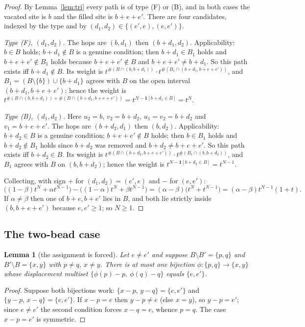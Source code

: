 \documentclass[11pt]{article}
\newtheorem{lemma}[theorem]{Lemma}
\theoremstyle{definition}
\newcommand{\one}{\mathbf{1}}
\begin{document}
\begin{proof}
By Lemma~\ref{lem:tri} every path is of type (F) or (B), and in both cases the vacated site is
$b$ and the filled site is $b+e+e'$. There are four candidates, indexed by the type and by
$(d_1,d_2)\in\{(e',e),(e,e')\}$.

\emph{Type (F), $(d_1,d_2)$.} The hops are $(b,d_1)$ then $(b+d_1,d_2)$. Applicability: $b\in B$
holds; $b+d_1\notin B$ is a genuine condition; then $b+d_1\in B_1$ holds and
$b+e+e'\notin B_1$ holds because $b+e+e'\notin B$ and $b+e+e'\ne b+d_1$. So this path exists iff
$b+d_1\notin B$. Its weight is $t^{\#(B\cap(b,b+d_1))}\cdot t^{\#(B_1\cap(b+d_1,b+e+e'))}$, and
$B_1=(B\setminus\{b\})\cup\{b+d_1\}$ agrees with $B$ on the open interval $(b+d_1,b+e+e')$;
hence the weight is
$t^{\#(B\cap(b,b+d_1))+\#(B\cap(b+d_1,b+e+e'))}=t^{N-\one[b+d_1\in B]}=t^{N}$.

\emph{Type (B), $(d_1,d_2)$.} Here $u_2=b$, $v_2=b+d_2$, $u_1=v_2=b+d_2$ and $v_1=b+e+e'$. The
hops are $(b+d_2,d_1)$ then $(b,d_2)$. Applicability: $b+d_2\in B$ is a genuine condition;
$b+e+e'\notin B$ holds; then $b\in B_1$ holds and $b+d_2\notin B_1$ holds since $b+d_2$ was
removed and $b+d_2\ne b+e+e'$. So this path exists iff $b+d_2\in B$. Its weight is
$t^{\#(B\cap(b+d_2,b+e+e'))}\cdot t^{\#(B_1\cap(b,b+d_2))}$, and $B_1$ agrees with $B$ on
$(b,b+d_2)$; hence the weight is $t^{N-\one[b+d_2\in B]}=t^{N-1}$.

Collecting, with sign $+$ for $(d_1,d_2)=(e',e)$ and $-$ for $(e,e')$:
\[
\bigl((1-\beta)t^{N}+\alpha t^{N-1}\bigr)-\bigl((1-\alpha)t^{N}+\beta t^{N-1}\bigr)
=(\alpha-\beta)\bigl(t^{N}+t^{N-1}\bigr)=(\alpha-\beta)t^{N-1}(1+t).
\]
If $\alpha\ne\beta$ then one of $b+e,b+e'$ lies in $B$, and both lie strictly inside
$(b,b+e+e')$ because $e,e'\ge1$; so $N\ge1$.
\end{proof}

\subsection*{The two-bead case}

\begin{lemma}[the assignment is forced]\label{lem:assign}
Let $e\ne e'$ and suppose $B\setminus B'=\{p,q\}$ and $B'\setminus B=\{x,y\}$ with $p\ne q$,
$x\ne y$. There is at most one bijection $\phi:\{p,q\}\to\{x,y\}$ whose displacement multiset
$\{\phi(p)-p,\ \phi(q)-q\}$ equals $\{e,e'\}$.
\end{lemma}

\begin{proof}
Suppose both bijections work: $\{x-p,\,y-q\}=\{e,e'\}$ and $\{y-p,\,x-q\}=\{e,e'\}$. If
$x-p=e$ then $y-p\ne e$ (else $x=y$), so $y-p=e'$; since $e\ne e'$ the second condition forces
$x-q=e$, whence $p=q$. The case $x-p=e'$ is symmetric.
\end{proof}
\end{document}
